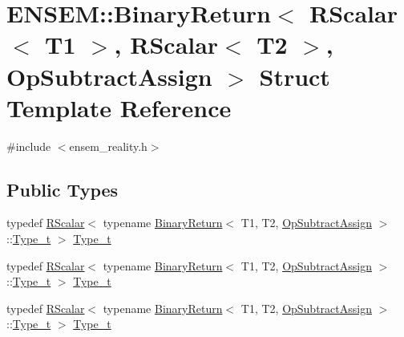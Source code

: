 \hypertarget{structENSEM_1_1BinaryReturn_3_01RScalar_3_01T1_01_4_00_01RScalar_3_01T2_01_4_00_01OpSubtractAssign_01_4}{}\section{E\+N\+S\+EM\+:\+:Binary\+Return$<$ R\+Scalar$<$ T1 $>$, R\+Scalar$<$ T2 $>$, Op\+Subtract\+Assign $>$ Struct Template Reference}
\label{structENSEM_1_1BinaryReturn_3_01RScalar_3_01T1_01_4_00_01RScalar_3_01T2_01_4_00_01OpSubtractAssign_01_4}


{\ttfamily \#include $<$ensem\+\_\+reality.\+h$>$}

\subsection*{Public Types}
\begin{DoxyCompactItemize}
\item 
typedef \mbox{\hyperlink{classENSEM_1_1RScalar}{R\+Scalar}}$<$ typename \mbox{\hyperlink{structENSEM_1_1BinaryReturn}{Binary\+Return}}$<$ T1, T2, \mbox{\hyperlink{structENSEM_1_1OpSubtractAssign}{Op\+Subtract\+Assign}} $>$\+::\mbox{\hyperlink{structENSEM_1_1BinaryReturn_3_01RScalar_3_01T1_01_4_00_01RScalar_3_01T2_01_4_00_01OpSubtractAssign_01_4_a21cc9f64f35d92dbf0a0560a7c7d6c28}{Type\+\_\+t}} $>$ \mbox{\hyperlink{structENSEM_1_1BinaryReturn_3_01RScalar_3_01T1_01_4_00_01RScalar_3_01T2_01_4_00_01OpSubtractAssign_01_4_a21cc9f64f35d92dbf0a0560a7c7d6c28}{Type\+\_\+t}}
\item 
typedef \mbox{\hyperlink{classENSEM_1_1RScalar}{R\+Scalar}}$<$ typename \mbox{\hyperlink{structENSEM_1_1BinaryReturn}{Binary\+Return}}$<$ T1, T2, \mbox{\hyperlink{structENSEM_1_1OpSubtractAssign}{Op\+Subtract\+Assign}} $>$\+::\mbox{\hyperlink{structENSEM_1_1BinaryReturn_3_01RScalar_3_01T1_01_4_00_01RScalar_3_01T2_01_4_00_01OpSubtractAssign_01_4_a21cc9f64f35d92dbf0a0560a7c7d6c28}{Type\+\_\+t}} $>$ \mbox{\hyperlink{structENSEM_1_1BinaryReturn_3_01RScalar_3_01T1_01_4_00_01RScalar_3_01T2_01_4_00_01OpSubtractAssign_01_4_a21cc9f64f35d92dbf0a0560a7c7d6c28}{Type\+\_\+t}}
\item 
typedef \mbox{\hyperlink{classENSEM_1_1RScalar}{R\+Scalar}}$<$ typename \mbox{\hyperlink{structENSEM_1_1BinaryReturn}{Binary\+Return}}$<$ T1, T2, \mbox{\hyperlink{structENSEM_1_1OpSubtractAssign}{Op\+Subtract\+Assign}} $>$\+::\mbox{\hyperlink{structENSEM_1_1BinaryReturn_3_01RScalar_3_01T1_01_4_00_01RScalar_3_01T2_01_4_00_01OpSubtractAssign_01_4_a21cc9f64f35d92dbf0a0560a7c7d6c28}{Type\+\_\+t}} $>$ \mbox{\hyperlink{structENSEM_1_1BinaryReturn_3_01RScalar_3_01T1_01_4_00_01RScalar_3_01T2_01_4_00_01OpSubtractAssign_01_4_a21cc9f64f35d92dbf0a0560a7c7d6c28}{Type\+\_\+t}}
\end{DoxyCompactItemize}


